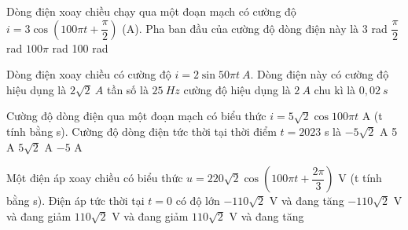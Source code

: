 \begin{vidu}%
	 Dòng điện xoay chiều chạy qua một đoạn mạch có cường độ $i=3\cos(100\pi t+\dfrac{\pi}{2})$ (A). Pha ban đầu của cường độ dòng điện này là
	\choice
	{3 rad}
	{\True $\dfrac{\pi}{2}$ rad}
	{$100\pi$ rad}
	{100 rad}
\end{vidu}
\begin{vidu} %
	Dòng điện xoay chiều có cường độ $i=2\sin50\pi t\ A$. Dòng điện này có
	\choice
	{cường độ hiệu dụng là $2\sqrt{2}\ A$}
	{\True tần số là $25\ Hz$}
	{cường độ hiệu dụng là $2\ A$}
	{chu kì là $0,02\ s$}
\end{vidu}
\begin{vidu}%
	Cường độ dòng điện qua một đoạn mạch có biểu thức $i=5\sqrt{2}\cos 100\pi t$ A (t tính bằng s). Cường độ dòng điện tức thời tại thời điểm $t = 2023$ s là
	\choice
	{$-5\sqrt{2}$ A}
	{5 A}
	{\True $5\sqrt{2}$ A}
	{$-5$ A}
\end{vidu}
\begin{vidu}%
	Một điện áp xoay chiều có biểu thức $u=220\sqrt{2}\cos  \left( 100\pi t+\dfrac{2\pi}{3} \right)$ V (t tính bằng s). Điện áp tức thời tại $t = 0$ có độ lớn
	\choice
	{$-110\sqrt{2}$ V và đang tăng}
	{\True $-110\sqrt{2}$ V  và đang giảm}
	{$110\sqrt{2}$ V  và đang giảm}
	{$110\sqrt{2}$ V và đang tăng}
\end{vidu}
